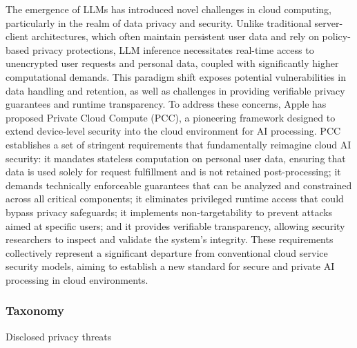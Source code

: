 The emergence of LLMs has introduced novel challenges in cloud computing, particularly in the realm of data privacy and security. Unlike traditional server-client architectures, which often maintain persistent user data and rely on policy-based privacy protections, LLM inference necessitates real-time access to unencrypted user requests and personal data, coupled with significantly higher computational demands. This paradigm shift exposes potential vulnerabilities in data handling and retention, as well as challenges in providing verifiable privacy guarantees and runtime transparency. To address these concerns, Apple has proposed Private Cloud Compute (PCC), a pioneering framework designed to extend device-level security into the cloud environment for AI processing. PCC establishes a set of stringent requirements that fundamentally reimagine cloud AI security: it mandates stateless computation on personal user data, ensuring that data is used solely for request fulfillment and is not retained post-processing; it demands technically enforceable guarantees that can be analyzed and constrained across all critical components; it eliminates privileged runtime access that could bypass privacy safeguards; it implements non-targetability to prevent attacks aimed at specific users; and it provides verifiable transparency, allowing security researchers to inspect and validate the system's integrity. These requirements collectively represent a significant departure from conventional cloud service security models, aiming to establish a new standard for secure and private AI processing in cloud environments.

\subsubsection{Taxonomy}

Disclosed privacy threats
